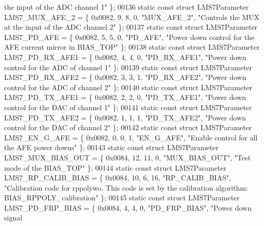 \begin{DoxyCode}
{       the input of the ADC channel 1"} \};
00136 \textcolor{keyword}{static} \textcolor{keyword}{const} \textcolor{keyword}{struct }LMS7Parameter LMS7_MUX_AFE_2 = \{ 0x0082, 9, 8, 0, \textcolor{stringliteral}{"MUX\_AFE\_2"}, \textcolor{stringliteral}{"Controls the MUX at the
       input of the ADC channel 2"} \};
00137 \textcolor{keyword}{static} \textcolor{keyword}{const} \textcolor{keyword}{struct }LMS7Parameter LMS7_PD_AFE = \{ 0x0082, 5, 5, 0, \textcolor{stringliteral}{"PD\_AFE"}, \textcolor{stringliteral}{"Power down control for the
       AFE current mirror in BIAS\_TOP"} \};
00138 \textcolor{keyword}{static} \textcolor{keyword}{const} \textcolor{keyword}{struct }LMS7Parameter LMS7_PD_RX_AFE1 = \{ 0x0082, 4, 4, 0, \textcolor{stringliteral}{"PD\_RX\_AFE1"}, \textcolor{stringliteral}{"Power down control
       for the ADC of  channel 1"} \};
00139 \textcolor{keyword}{static} \textcolor{keyword}{const} \textcolor{keyword}{struct }LMS7Parameter LMS7_PD_RX_AFE2 = \{ 0x0082, 3, 3, 1, \textcolor{stringliteral}{"PD\_RX\_AFE2"}, \textcolor{stringliteral}{"Power down control
       for the ADC of channel 2"} \};
00140 \textcolor{keyword}{static} \textcolor{keyword}{const} \textcolor{keyword}{struct }LMS7Parameter LMS7_PD_TX_AFE1 = \{ 0x0082, 2, 2, 0, \textcolor{stringliteral}{"PD\_TX\_AFE1"}, \textcolor{stringliteral}{"Power down control
       for the DAC of channel 1"} \};
00141 \textcolor{keyword}{static} \textcolor{keyword}{const} \textcolor{keyword}{struct }LMS7Parameter LMS7_PD_TX_AFE2 = \{ 0x0082, 1, 1, 1, \textcolor{stringliteral}{"PD\_TX\_AFE2"}, \textcolor{stringliteral}{"Power down control
       for the DAC of channel 2"} \};
00142 \textcolor{keyword}{static} \textcolor{keyword}{const} \textcolor{keyword}{struct }LMS7Parameter LMS7_EN_G_AFE = \{ 0x0082, 0, 0, 1, \textcolor{stringliteral}{"EN\_G\_AFE"}, \textcolor{stringliteral}{"Enable control for all
       the AFE power downs"} \};
00143 \textcolor{keyword}{static} \textcolor{keyword}{const} \textcolor{keyword}{struct }LMS7Parameter LMS7_MUX_BIAS_OUT = \{ 0x0084, 12, 11, 0, \textcolor{stringliteral}{"MUX\_BIAS\_OUT"}, \textcolor{stringliteral}{"Test mode of
       the BIAS\_TOP"} \};
00144 \textcolor{keyword}{static} \textcolor{keyword}{const} \textcolor{keyword}{struct }LMS7Parameter LMS7_RP_CALIB_BIAS = \{ 0x0084, 10, 6, 16, \textcolor{stringliteral}{"RP\_CALIB\_BIAS"}, \textcolor{stringliteral}{"Calibration
       code for rppolywo. This code is set by the calibration algorithm: BIAS\_RPPOLY\_calibration"} \};
00145 \textcolor{keyword}{static} \textcolor{keyword}{const} \textcolor{keyword}{struct }LMS7Parameter LMS7_PD_FRP_BIAS = \{ 0x0084, 4, 4, 0, \textcolor{stringliteral}{"PD\_FRP\_BIAS"}, \textcolor{stringliteral}{"Power down signal
}
\end{DoxyCode}
